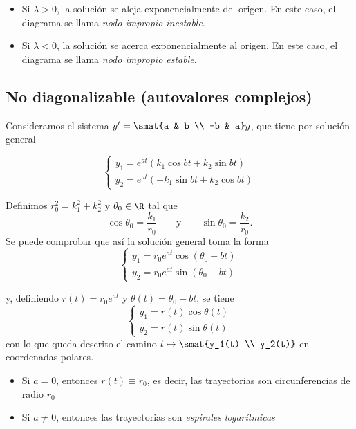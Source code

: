 \documentclass[../main.tex]{subfiles}
\begin{document}
\begin{itemize}
\item Si \(\lambda > 0\), la solución se aleja exponencialmente del origen. En
  este caso, el diagrama se llama \emph{nodo impropio inestable}.
\item Si \(\lambda < 0\), la solución se acerca exponencialmente al origen. En
  este caso, el diagrama se llama \emph{nodo impropio estable}.
\end{itemize}

\subsection{No diagonalizable (autovalores complejos)}
Consideramos el sistema \(y' = \smat{a & b \\ -b & a}y\), que tiene por solución
general

\[
  \begin{cases}
    y_1 = e^{at}(k_1 \cos bt + k_2 \sin bt) \\
    y_2 = e^{at}(-k_1 \sin bt + k_2 \cos bt)
  \end{cases}
\]

Definimos \(r_0^2 = k_1^2+k_2^2\) y \(\theta_0 \in \R\) tal que
\[\cos \theta_0 = \frac{k_1}{r_0} \qquad \text{y} \qquad \sin \theta_0 = \frac{k_2}{r_0}.\]
Se puede comprobar que así la solución general toma la forma
\[
  \begin{cases}
    y_1 = r_0e^{at} \cos (\theta_0 - bt) \\
    y_2 = r_0e^{at} \sin (\theta_0 - bt)
  \end{cases}
\]

y, definiendo \(r(t) = r_0e^{at}\) y \(\theta(t) = \theta_0 - bt\), se tiene
\[
  \begin{cases}
    y_1 = r(t) \cos \theta(t) \\
    y_2 = r(t) \sin \theta(t)
  \end{cases}
\]
con lo que queda descrito el camino \(t \mapsto \smat{y_1(t) \\ y_2(t)}\) en
coordenadas polares.

\begin{itemize}
\item Si \(a = 0\), entonces \(r(t) \equiv r_0\), es decir, las trayectorias son
  circunferencias de radio \(r_0\)
\item Si \(a \neq 0\), entonces las trayectorias son \emph{espirales logarítmicas}
\end{itemize}
\end{document}
